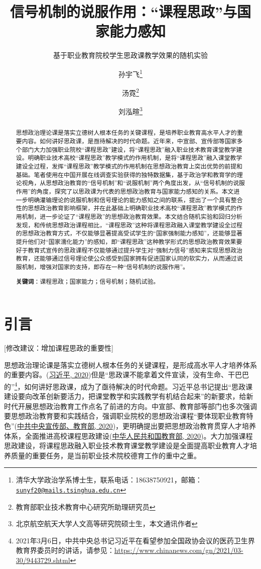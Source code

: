 \documentclass[
  12pt,
]{ctexart}
\title{信号机制的说服作用：``课程思政''与国家能力感知}
\subtitle{基于职业教育院校学生思政课教学效果的随机实验}
\author{孙宇飞\footnote{清华大学政治学系博士生，联系电话：18638750921，邮箱：\href{mailto:sunyf20@mails.tsinghua.edu.cn}{\nolinkurl{sunyf20@mails.tsinghua.edu.cn}}} \and 汤霓\footnote{教育部职业技术教育中心研究所助理研究员} \and 刘泓暄\footnote{北京航空航天大学人文高等研究院硕士生，本文通讯作者}}
\date{}
\begin{document}
\maketitle
\begin{abstract}
思想政治理论课是落实立德树人根本任务的关键课程，是培养职业教育高水平人才的重要内容。如何讲好思政课，是亟待解决的时代命题。近年来，中宣部、宣传部等国家多个部门大力加强职业院校``课程思政''建设，将``课程思政''融入职业技术教育课堂教学建设。明确职业技术高校``课程思政''教学模式的作用机制，是将``课程思政''融入课堂教学建设全过程，发挥``课程思政''教学模式的作用机制在思想政治教育上突出优势的前提和基础。笔者使用在中国开展在线调查实验获得的独特数据集，基于政治学和教育学的理论视角，从思想政治教育的``信号机制''和``说服机制''两个角度出发，从``信号机制的说服作用''的角度，探究了以思政课为代表的思想政治教育与国家能力感知的关系。本文进一步明确灌输理论的说服机制和信号理论的能力感知之间的联系，提出了一个具有整合性的思想政治教育影响框架，并在此基础上明确职业技术高校``课程思政''教学模式的作用机制，进一步论证了``课程思政''的思想政治教育效果。本文结合随机实验和回归分析发现，和传统思想政治课程相比，``课程思政''这种将课程思政融入课堂教学建设全过程的思想政治教育方式，不仅能够显著提高受试学生的``国家强制能力感知''，还能够显著提升他们对``国家濡化能力''的感知，即``课程思政''这种教学形式的思想政治教育效果要好于教育式宣传的思政课程不仅能够通过提升学生对``强制力信号''感知来实现思想政治教育，还能够通过信号理论使公众感受到国家拥有促进国家认同的软实力，从而通过说服机制，增强对国家的支持，即存在一种``信号机制的说服作用''。

\textbf{关键词}：课程思政；国家能力；信号机制；随机试验。
\end{abstract}

\newpage

\hypertarget{ux5f15ux8a00}{%
\section{引言}\label{ux5f15ux8a00}}

{[}修改建议：增加课程思政的重要性{]}

思想政治理论课是落实立德树人根本任务的关键课程，是形成高水平人才培养体系的重要内容。(\protect\hyperlink{ref-XiJinPing2020}{习近平, 2020})但是``思政课不能拿着文件宣读，没有生命、干巴巴的''\footnote{2021年3月6日，中共中央总书记习近平在看望参加全国政协会议的医药卫生界教育界委员时的讲话，请参见：\url{https://www.chinanews.com/gn/2021/03-30/9443729.shtml}}，如何讲好思政课，成为了亟待解决的时代命题。习近平总书记提出``思政课建设要向改革创新要活力，把课堂教学和实践教学有机结合起来''的新要求，给新时代开展思想政治教育工作点名了前进的方向。中宣部、教育部等部门也多次强调要思想政治教育要和实践结合，强调职业院校的思想政治课程``要体现职业教育特色''(\protect\hyperlink{ref-ZhongGongZhongYangXuanChuanBuJiaoYuBu2020}{中共中央宣传部、教育部, 2020})，更明确提出要把思想政治教育贯穿人才培养体系，全面推进高校课程思政建设(\protect\hyperlink{ref-ZhongHuaRenMinGongHeGuoJiaoYuBu2020}{中华人民共和国教育部, 2020})。大力加强课程思政建设，将课程思政融入职业技术教育课堂教学建设是全面提高职业教育人才培养质量的重要任务，是当前职业技术院校德育工作的重中之重。
\end{document}
